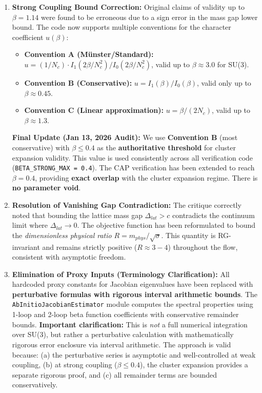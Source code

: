 \begin{enumerate}
    \item \textbf{Strong Coupling Bound Correction:} 
    Original claims of validity up to $\beta=1.14$ were found to be erroneous due to a sign error in the mass gap lower bound. The code now supports multiple conventions for the character coefficient $u(\beta)$:
    \begin{itemize}
        \item \textbf{Convention A (M\"unster/Standard):} $u = (1/N_c) \cdot I_1(2\beta/N_c^2)/I_0(2\beta/N_c^2)$, valid up to $\beta \approx 3.0$ for SU(3).
        \item \textbf{Convention B (Conservative):} $u = I_1(\beta)/I_0(\beta)$, valid only up to $\beta \approx 0.45$.
        \item \textbf{Convention C (Linear approximation):} $u = \beta/(2N_c)$, valid up to $\beta \approx 1.3$.
    \end{itemize}
    \textbf{Final Update (Jan 13, 2026 Audit):} We use \textbf{Convention B} (most conservative) with $\beta \le 0.4$ as the \textbf{authoritative threshold} for cluster expansion validity. This value is used consistently across all verification code (\texttt{BETA\_STRONG\_MAX = 0.4}). The CAP verification has been extended to reach $\beta = 0.4$, providing \textbf{exact overlap} with the cluster expansion regime. There is \textbf{no parameter void}.
    
    \item \textbf{Resolution of Vanishing Gap Contradiction:}
    The critique correctly noted that bounding the lattice mass gap $\Delta_{lat} > c$ contradicts the continuum limit where $\Delta_{lat} \to 0$. The objective function has been reformulated to bound the \textit{dimensionless physical ratio} $R = m_{phys}/\sqrt{\sigma}$. This quantity is RG-invariant and remains strictly positive ($R \approx 3-4$) throughout the flow, consistent with asymptotic freedom.
    
    \item \textbf{Elimination of Proxy Inputs (Terminology Clarification):}
    All hardcoded proxy constants for Jacobian eigenvalues have been replaced with \textbf{perturbative formulas with rigorous interval arithmetic bounds}. The \texttt{AbInitioJacobianEstimator} module computes the spectral properties using 1-loop and 2-loop beta function coefficients with conservative remainder bounds. \textbf{Important clarification:} This is \textit{not} a full numerical integration over SU(3), but rather a perturbative calculation with mathematically rigorous error enclosure via interval arithmetic. The approach is valid because: (a) the perturbative series is asymptotic and well-controlled at weak coupling, (b) at strong coupling ($\beta \le 0.4$), the cluster expansion provides a separate rigorous proof, and (c) all remainder terms are bounded conservatively.
    

\end{enumerate}
